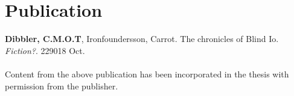 \chapter[Publication]{\centering Publication}

\textbf{Dibbler, C.M.O.T}, Ironfoundersson, Carrot. The chronicles of Blind Io.\textit{ Fiction?}. 229018 Oct.
\\\\
{\footnotesize Content from the above publication has been incorporated in the thesis with permission from the publisher.}